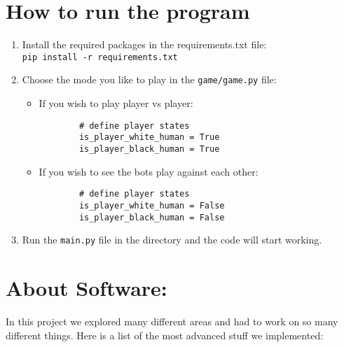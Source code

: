 \documentclass{article}
\begin{document}
\section*{How to run the program}
\begin{enumerate}
    \item Install the required packages in the requirements.txt file:\\
    \texttt{pip install -r requirements.txt}
    \item Choose the mode you like to play in the \texttt{game/game.py} file:
    \begin{itemize}
        \item If you wish to play player vs player:
        \begin{verbatim}
        # define player states
        is_player_white_human = True
        is_player_black_human = True
        \end{verbatim}
        \item If you wish to see the bots play against each other:
        \begin{verbatim}
        # define player states
        is_player_white_human = False
        is_player_black_human = False
        \end{verbatim}
    \end{itemize}
    \item Run the \texttt{main.py} file in the directory and the code will start working.
\end{enumerate}

\section*{About Software:}
In this project we explored many different areas and had to work on so many different things. Here is a list of the most advanced stuff we implemented:
\end{document}
